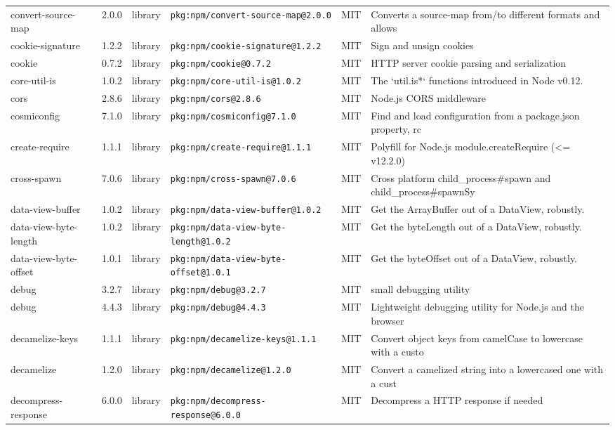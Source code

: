 \documentclass[11pt]{article}
\begin{document}
\begin{longtable}{|l|l|l|p{2.2cm}|l|p{4cm}|}
convert-source-map & 2.0.0 & library & \texttt{pkg:npm/convert-source-map@2.0.0} & MIT & Converts a source-map from/to  different formats and allows  \\
cookie-signature & 1.2.2 & library & \texttt{pkg:npm/cookie-signature@1.2.2} & MIT & Sign and unsign cookies \\
cookie & 0.7.2 & library & \texttt{pkg:npm/cookie@0.7.2} & MIT & HTTP server cookie parsing and serialization \\
core-util-is & 1.0.2 & library & \texttt{pkg:npm/core-util-is@1.0.2} & MIT & The `util.is*` functions introduced in Node v0.12. \\
cors & 2.8.6 & library & \texttt{pkg:npm/cors@2.8.6} & MIT & Node.js CORS middleware \\
cosmiconfig & 7.1.0 & library & \texttt{pkg:npm/cosmiconfig@7.1.0} & MIT & Find and load configuration from a package.json property, rc \\
create-require & 1.1.1 & library & \texttt{pkg:npm/create-require@1.1.1} & MIT & Polyfill for Node.js module.createRequire (<= v12.2.0) \\
cross-spawn & 7.0.6 & library & \texttt{pkg:npm/cross-spawn@7.0.6} & MIT & Cross platform child\_process\#spawn and child\_process\#spawnSy \\
data-view-buffer & 1.0.2 & library & \texttt{pkg:npm/data-view-buffer@1.0.2} & MIT & Get the ArrayBuffer out of a DataView, robustly. \\
data-view-byte-length & 1.0.2 & library & \texttt{pkg:npm/data-view-byte-length@1.0.2} & MIT & Get the byteLength out of a DataView, robustly. \\
data-view-byte-offset & 1.0.1 & library & \texttt{pkg:npm/data-view-byte-offset@1.0.1} & MIT & Get the byteOffset out of a DataView, robustly. \\
debug & 3.2.7 & library & \texttt{pkg:npm/debug@3.2.7} & MIT & small debugging utility \\
debug & 4.4.3 & library & \texttt{pkg:npm/debug@4.4.3} & MIT & Lightweight debugging utility for Node.js and the browser \\
decamelize-keys & 1.1.1 & library & \texttt{pkg:npm/decamelize-keys@1.1.1} & MIT & Convert object keys from camelCase to lowercase with a custo \\
decamelize & 1.2.0 & library & \texttt{pkg:npm/decamelize@1.2.0} & MIT & Convert a camelized string into a lowercased one with a cust \\
decompress-response & 6.0.0 & library & \texttt{pkg:npm/decompress-response@6.0.0} & MIT & Decompress a HTTP response if needed \\

\end{longtable}
\end{document}
